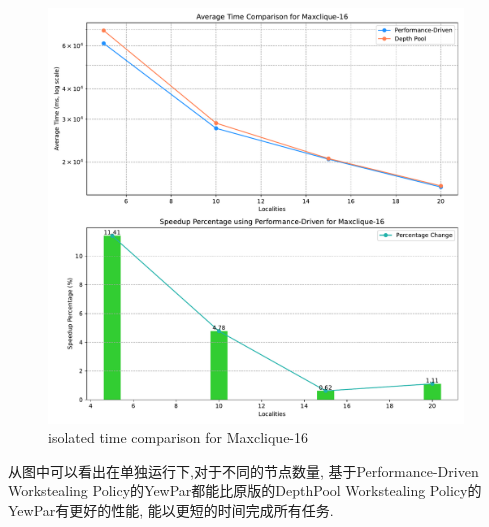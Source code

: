 \documentclass{mproj}
\begin{document}
\begin{figure}[h]
    \centering %
    \includegraphics[width=0.98\textwidth]{images/time_comparison_max_solo.pdf} %
    \caption{isolated time comparison for Maxclique-16} %
    \label{fig:time_comparison_max_solo} %
\end{figure}
\FloatBarrier

从图中可以看出在单独运行下,对于不同的节点数量,
基于Performance-Driven Workstealing Policy的YewPar都能比原版的DepthPool Workstealing Policy的YewPar有更好的性能,
能以更短的时间完成所有任务.
\end{document}
